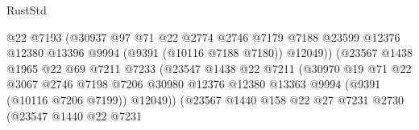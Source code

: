 \begin{lexlean}{RustStd}
\begin{coremodule}
                                        @22
                                        @7193
                                        (@30937
                                          @97
                                          @71
                                          @22
                                          @2774
                                          @2746
                                          @7179
                                          @7188
                                          @23599
                                          @12376
                                          @12380
                                          @13396
                                          @9994
                                          (@9391 (@10116 @7188 @7180))
                                          @12049))
                                      (@23567
                                        @1438
                                        @1965
                                        @22
                                        @69
                                        @7211
                                        @7233
                                        (@23547
                                          @1438
                                          @22
                                          @7211
                                          (@30970
                                            @19
                                            @71
                                            @22
                                            @3067
                                            @2746
                                            @7198
                                            @7206
                                            @30980
                                            @12376
                                            @12380
                                            @13363
                                            @9994
                                            (@9391 (@10116 @7206 @7199))
                                            @12049))
                                        (@23567
                                          @1440
                                          @158
                                          @22
                                          @27
                                          @7231
                                          @2730
                                          (@23547
                                            @1440
                                            @22
                                            @7231

\end{coremodule}
\end{lexlean}
